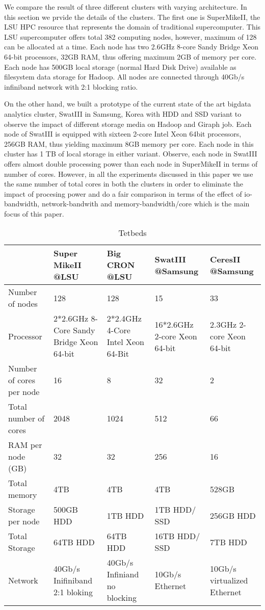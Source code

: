 We compare the result of three different clusters with varying architecture.
In this section we prvide the details of the clusters.
The first one is SuperMikeII, the LSU HPC resource that represents the domain of traditional supercomputer.
This LSU supercomputer offers total 382 computing nodes, however, maximum of 128 can be allocated at a time. 
Each node has two 2.6GHz 8-core Sandy Bridge Xeon 64-bit processors, 32GB RAM, thus offering maximum 2GB of memory per core. 
Each node has 500GB local storage (normal Hard Disk Drive) available as filesystem data storage for Hadoop.
All nodes are connected through 40Gb/s infiniband network with 2:1 blocking ratio.

On the other hand, we built a prototype of the current state of the art bigdata analytics cluster, SwatIII in Samsung, Korea with HDD and SSD variant to observe the impact of different storage media on Hadoop and Giraph job.
Each node of SwatIII is equipped with sixteen 2-core Intel Xeon 64bit processors, 256GB RAM, thus yielding maximum 8GB memory per core.
Each node in this cluster has 1 TB of local storage in either variant.
Observe, each node in SwatIII offers almost double processing power than each node in SuperMikeII in terms of number of cores. 
However, in all the experiments discussed in this paper we use the same number of total cores in both the clusters in order to eliminate the impact of procesing power and do a fair comparison in terms of the effect of io-bandwidth, network-bandwith and memory-bandwidth/core which is the main focus of this paper.

\begin{center}
\begin{table}
    \begin{tabular}{ |p{1.3cm} | p{1.3cm} | p{1.3cm} | p{1.3cm} | p{1.3cm} |} \hline
    & Super MikeII @LSU & Big CRON @LSU & SwatIII @Samsung & CeresII @Samsung \\ \hline
    Number of nodes & 128 & 128 & 15 & 33 \\ \hline
    Processor & 2*2.6GHz 8-Core Sandy Bridge Xeon 64-bit & 2*2.4GHz 4-Core Intel Xeon 64-Bit & 16*2.6GHz 2-core Xeon 64-bit & 2.3GHz 2-core Xeon 64-bit \\ \hline \hline 
    Number of cores per node & 16 & 8 & 32 & 2 \\ \hline
    Total number of cores & 2048 & 1024 & 512 & 66 \\ \hline \hline
    RAM per node (GB) & 32 & 32 & 256 & 16 \\ \hline
    Total memory & 4TB & 4TB & 4TB & 528GB \\ \hline \hline
    Storage per node & 500GB HDD & 1TB HDD & 1TB HDD/ SSD & 256GB HDD \\ \hline
    Total Storage & 64TB HDD & 64TB HDD & 16TB HDD/ SSD & 7TB HDD \\ \hline \hline
    Network & 40Gb/s Inifiniband 2:1 bloking & 40Gb/s Infiniand no blocking & 10Gb/s Ethernet & 10Gb/s virtualized Ethernet\\ \hline
    \end{tabular}
    \caption{Tetbeds}
	\label{table:testbeds}
\end{table}
\end{center}
